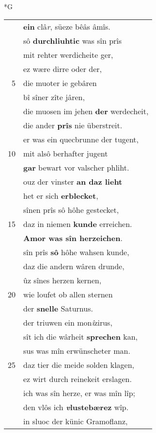 \documentclass[8pt,a4paper,notitlepage]{article}
\begin{document}
\begin{table}[ht]
\begin{minipage}[t]{0.5\linewidth}
\small
\begin{center}*G
\end{center}
\begin{tabular}{rl}
 & \textbf{ein} clâ\textit{r}, süeze bêâs âmîs.\\ 
 & sô \textbf{durchliuhtic} was sîn prîs\\ 
 & mit rehter werdicheite ger,\\ 
 & ez wære dirre oder der,\\ 
5 & die muoter ie gebâren\\ 
 & bî sîner zîte jâren,\\ 
 & die muosen im jehen \textbf{der} werdecheit,\\ 
 & die ander \textbf{prîs} nie überstreit.\\ 
 & er was ein quecbrunne der tugent,\\ 
10 & mit alsô berhafter jugent\\ 
 & \textbf{gar} bewart vor valscher phliht.\\ 
 & ouz der vinster \textbf{an daz lieht}\\ 
 & het er sich \textbf{erblecket},\\ 
 & sînen prîs sô hôhe gestecket,\\ 
15 & daz in niemen \textbf{kunde} erreichen.\\ 
 & \textbf{Amor was sîn herzeichen}.\\ 
 & sîn prîs \textbf{sô} hôhe wahsen kunde,\\ 
 & daz die andern wâren drunde,\\ 
 & ûz sînes herzen kernen,\\ 
20 & wie loufet ob allen sternen\\ 
 & der \textbf{snelle} Saturnus.\\ 
 & der triuwen ein mon\textit{î}zirus,\\ 
 & sît ich die wârheit \textbf{sprechen} kan,\\ 
 & sus was mîn erwünscheter man.\\ 
25 & daz tier die meide solden klagen,\\ 
 & ez wirt durch reinekeit erslagen.\\ 
 & ich was sîn herze, er was mîn lîp;\\ 
 & den vlôs ich \textbf{\textit{v}lustebærez} wîp.\\ 
 & in sluoc der künic Gramoflanz,\\ 

\end{tabular}
\end{minipage}
\end{table}
\end{document}
